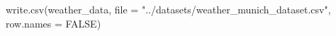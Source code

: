 \documentclass[
]{article}
\newenvironment{Shaded}{\begin{snugshade}}{\end{snugshade}}
\newcommand{\AttributeTok}[1]{\textcolor[rgb]{0.77,0.63,0.00}{#1}}
\newcommand{\ConstantTok}[1]{\textcolor[rgb]{0.00,0.00,0.00}{#1}}
\newcommand{\FunctionTok}[1]{\textcolor[rgb]{0.00,0.00,0.00}{#1}}
\newcommand{\NormalTok}[1]{#1}
\newcommand{\StringTok}[1]{\textcolor[rgb]{0.31,0.60,0.02}{#1}}
\begin{document}
\begin{Shaded}
\begin{Highlighting}[]
\FunctionTok{write.csv}\NormalTok{(weather\_data, }\AttributeTok{file =} \StringTok{"../datasets/weather\_munich\_dataset.csv"}\NormalTok{, }\AttributeTok{row.names =} \ConstantTok{FALSE}\NormalTok{)}
\end{Highlighting}
\end{Shaded}
\end{document}
